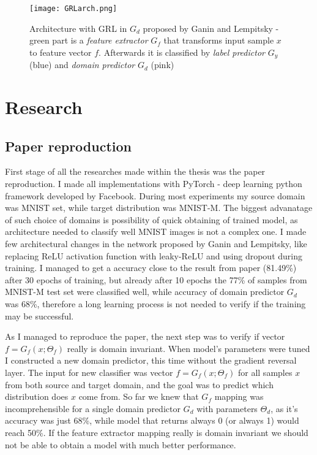 \documentclass{article}
\begin{document}
\begin{figure}%
    \centering
    \texttt{[image: GRLarch.png]}%
    \caption{Architecture with GRL in $G_{d}$ proposed by Ganin and Lempitsky - green part is a \textit{feature extractor} $G_{f}$ that transforms input sample $x$ to feature vector $f$. Afterwards it is classified by \textit{label predictor} $G_{y}$ (blue) and \textit{domain predictor} $G_{d}$ (pink)}
    \label{fig:GRLarch}%
\end{figure}

\section{Research}
\subsection{Paper reproduction}
First stage of all the researches made within the thesis was the paper reproduction. I made all implementations with PyTorch - deep learning python framework developed by Facebook. During most experiments my source domain was MNIST set, while target distribution was MNIST-M. The biggest advanatage of such choice of domains is possibility of quick obtaining of trained model, as architecture needed to classify well MNIST images is not a complex one. I made few architectural changes in the network proposed by Ganin and Lempitsky, like replacing ReLU activation function with leaky-ReLU and using dropout during training. I managed to get a accuracy close to the result from paper (81.49\%) after 30 epochs of training, but already after 10 epochs the 77\% of samples from MNIST-M test set were classified well, while accuracy of domain predictor $G_{d}$ was 68\%, therefore a long learning process is not needed to verify if the training may be successful.
\par
As I managed to reproduce the paper, the next step was to verify if vector $f=G_{f}(x;\Theta_{f})$ really is domain invariant. When model's parameters were tuned I constructed a new domain predictor, this time without the gradient reversal layer. The input for new classifier was  vector $f = G_{f}(x;\Theta_{f})$ for all samples $x$ from both source and target domain, and the goal was to predict which distribution does $x$ come from. So far we knew that $G_{f}$ mapping was incomprehensible for a single domain predictor $G_{d}$ with parameters $\Theta_{d}$, as it's accuracy was just 68\%, while model that returns always 0 (or always 1) would reach 50\%. If the feature extractor mapping really is domain invariant we should not be able to obtain a model with much better performance.
\end{document}

